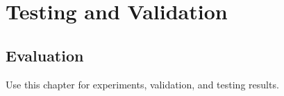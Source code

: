\chapter{Testing and Validation}
\label{chap:testing}

\section{Evaluation}
\label{sec:evaluation}

Use this chapter for experiments, validation, and testing results.
